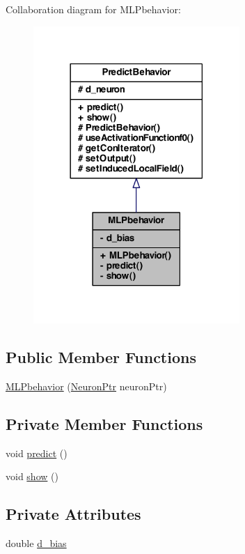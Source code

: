 Collaboration diagram for MLPbehavior:
\nopagebreak
\begin{figure}[H]
\begin{center}
\leavevmode
\includegraphics[width=222pt]{class_m_l_pbehavior__coll__graph}
\end{center}
\end{figure}
\subsection*{Public Member Functions}
\begin{DoxyCompactItemize}
\item 
\hyperlink{class_m_l_pbehavior_a6e42077295843dd0d9e52f2776f4309e}{MLPbehavior} (\hyperlink{_a_m_o_r_e_8h_ac1ea936c2c7728eb382278131652fef4}{NeuronPtr} neuronPtr)
\end{DoxyCompactItemize}
\subsection*{Private Member Functions}
\begin{DoxyCompactItemize}
\item 
void \hyperlink{class_m_l_pbehavior_aaff94adc3577cda9e48d8da925b0ffbf}{predict} ()
\item 
void \hyperlink{class_m_l_pbehavior_a32aa885e07e8f4eb33e05afb46040567}{show} ()
\end{DoxyCompactItemize}
\subsection*{Private Attributes}
\begin{DoxyCompactItemize}
\item 
double \hyperlink{class_m_l_pbehavior_a6206785c5c3f838a0538f9f77fa7a25a}{d\_\-bias}
\end{DoxyCompactItemize}

